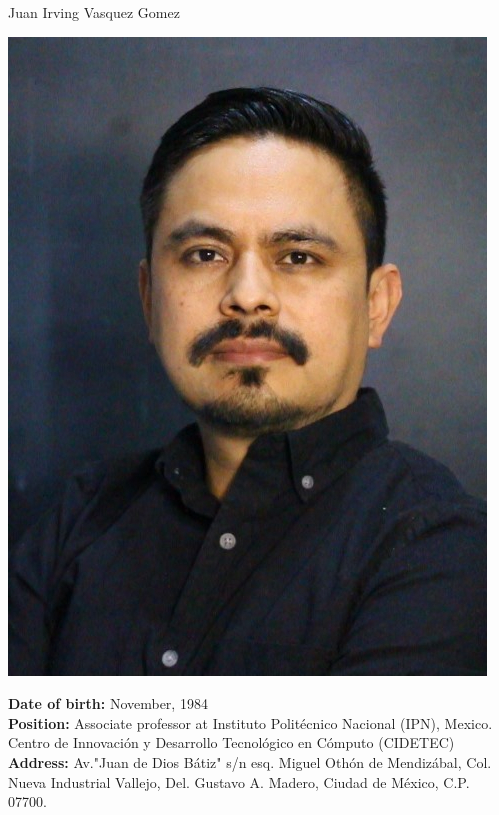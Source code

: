 \documentclass[10pt]{article}
\begin{document}
	
	\begin{center}
		{\huge Juan Irving Vasquez Gomez}
		\vspace{0.5cm}
		
		\begin{minipage}[b]{0.3\linewidth}
			\centering
			\includegraphics[width=\textwidth]{jivg36}
		\end{minipage}
		\hspace{0.5cm}
		\begin{minipage}[b]{0.6\linewidth}
			\textbf{Date of birth:} November, 1984 \\
			\textbf{Position:} Associate professor at Instituto Politécnico Nacional (IPN), Mexico.
			Centro de Innovación y Desarrollo Tecnológico en Cómputo (CIDETEC) \\ 
			\textbf{Address:} Av."Juan de Dios Bátiz" s/n esq. Miguel Othón de Mendizábal, 
			Col. Nueva Industrial Vallejo, Del. Gustavo A. Madero, Ciudad de México, C.P. 07700. \\

\end{minipage}
\end{center}
\end{document}
